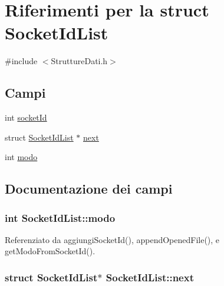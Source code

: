 \hypertarget{structSocketIdList}{}\section{Riferimenti per la struct Socket\+Id\+List}
\label{structSocketIdList}


{\ttfamily \#include $<$Strutture\+Dati.\+h$>$}

\subsection*{Campi}
\begin{DoxyCompactItemize}
\item 
int \hyperlink{structSocketIdList_ae3472c269defc3b5c5158bb23316989d}{socket\+Id}
\item 
struct \hyperlink{structSocketIdList}{Socket\+Id\+List} $\ast$ \hyperlink{structSocketIdList_a6a4ac9d91704e30a162d520bca97a270}{next}
\item 
int \hyperlink{structSocketIdList_a84ef1b1879e61c17fe09e27e2038d0ee}{modo}
\end{DoxyCompactItemize}


\subsection{Documentazione dei campi}
\hypertarget{structSocketIdList_a84ef1b1879e61c17fe09e27e2038d0ee}{}
\subsubsection[{modo}]{\setlength{\rightskip}{0pt plus 5cm}int Socket\+Id\+List\+::modo}\label{structSocketIdList_a84ef1b1879e61c17fe09e27e2038d0ee}


Referenziato da aggiungi\+Socket\+Id(), append\+Opened\+File(), e get\+Modo\+From\+Socket\+Id().

\hypertarget{structSocketIdList_a6a4ac9d91704e30a162d520bca97a270}{}
\subsubsection[{next}]{\setlength{\rightskip}{0pt plus 5cm}struct {\bf Socket\+Id\+List}$\ast$ Socket\+Id\+List\+::next}\label{structSocketIdList_a6a4ac9d91704e30a162d520bca97a270}


